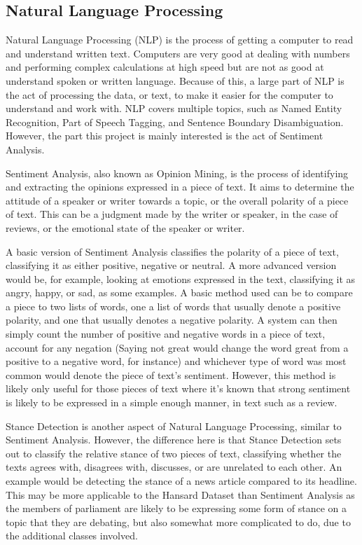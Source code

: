 \subsection{Natural Language Processing}
\label{sec:bck_NLP}
Natural Language Processing (NLP) is the process of getting a computer to read and understand written text. Computers are very good at dealing with numbers and performing complex calculations at high speed but are not as good at understand spoken or written language. Because of this, a large part of NLP is the act of processing the data, or text, to make it easier for the computer to understand and work with. NLP covers multiple topics, such as Named Entity Recognition, Part of Speech Tagging, and Sentence Boundary Disambiguation. However, the part this project is mainly interested is the act of Sentiment Analysis.

Sentiment Analysis, also known as Opinion Mining, is the process of identifying and extracting the opinions expressed in a piece of text. It aims to determine the attitude of a speaker or writer towards a topic, or the overall polarity of a piece of text. This can be a judgment made by the writer or speaker, in the case of reviews, or the emotional state of the speaker or writer.

A basic version of Sentiment Analysis classifies the polarity of a piece of text, classifying it as either positive, negative or neutral. A more advanced version would be, for example, looking at emotions expressed in the text, classifying it as angry, happy, or sad, as some examples. A basic method used can be to compare a piece to two lists of words, one a list of words that usually denote a positive polarity, and one that usually denotes a negative polarity. A system can then simply count the number of positive and negative words in a piece of text, account for any negation (Saying not great would change the word great from a positive to a negative word, for instance) and whichever type of word was most common would denote the piece of text’s sentiment. However, this method is likely only useful for those pieces of text where it’s known that strong sentiment is likely to be expressed in a simple enough manner, in text such as a review.  

Stance Detection is another aspect of Natural Language Processing, similar to Sentiment Analysis. However, the difference here is that Stance Detection sets out to classify the relative stance of two pieces of text, classifying whether the texts agrees with, disagrees with, discusses, or are unrelated to each other. An example would be detecting the stance of a news article compared to its headline. This may be more applicable to the Hansard Dataset than Sentiment Analysis as the members of parliament are likely to be expressing some form of stance on a topic that they are debating, but also somewhat more complicated to do, due to the additional classes involved.

